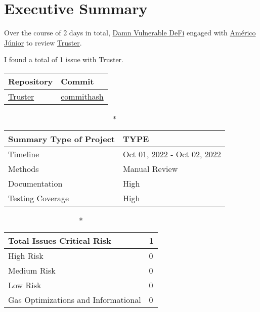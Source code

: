 \hypertarget{executive-summary}{%
\section{Executive Summary}\label{executive-summary}}

Over the course of 2 days in total, \href{https://www.damnvulnerabledefi.xyz}{Damn Vulnerable DeFi} engaged with
\href{https://americojunior.com}{Américo Júnior} to review
\href{https://www.damnvulnerabledefi.xyz/challenges/3.html}{Truster}. 

I found a total of 1 issue with Truster. 

\begin{longtable}[c]{|l|l|}
\hline \textbf{Repository} & \textbf{Commit} \\

\hline
\href{https://www.damnvulnerabledefi.xyz/challenges/3.html}{Truster} &
\href{https://github.com/permalink/commit/commithash}{commithash} \\
\hline
\end{longtable}

\begin{longtable}[]{|l|l|}

\caption*{\textbf{Summary}}
\hline Type of Project & TYPE \\   
\hline Timeline & Oct 01, 2022 - Oct 02, 2022   \\
\hline Methods & Manual Review \\
\hline Documentation & High \\
\hline Testing Coverage & High  \\
\hline
\end{longtable}


\begin{longtable}[]{|l|l|}
\caption*{\textbf{Total Issues}}
\hline Critical Risk & 1 \\
\hline High Risk & 0 \\
\hline Medium Risk & 0 \\ 
\hline Low Risk & 0 \\
\hline Gas Optimizations and Informational & 0 \\
\hline
\end{longtable}

